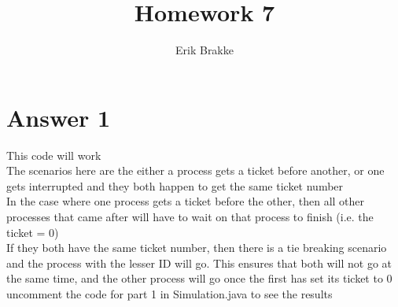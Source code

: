 \documentclass[11pt]{article}
\theoremstyle{definition}
\begin{document}
\title{Homework 7}
\author{Erik Brakke}
\maketitle

\thispagestyle{fancy}
 
 
\section*{Answer 1}
This code will work\\
The scenarios here are the either a process gets a ticket before another, or one gets interrupted and they both happen to get the same ticket number\\
In the case where one process gets a ticket before the other, then all other processes that came after will have to wait on that process to finish (i.e. the ticket = 0)\\
If they both have the same ticket number, then there is a tie breaking scenario and the process with the lesser ID will go.  This ensures that both will not go at the same time, and the other process will go once the first has set its ticket to 0\\
\newline
uncomment the code for part 1 in Simulation.java to see the results
\end{document}
